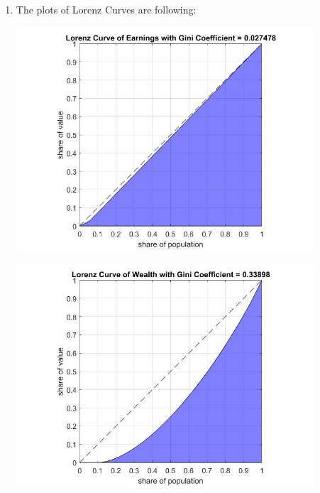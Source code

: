 \documentclass[12pt]{article}
\begin{document}
\begin{enumerate}
\begin{center}
\end{center}
\pagebreak
\item The plots of Lorenz Curves are following:
\begin{center}
  \includegraphics[width=111.11mm]{LorenzCurveofEarnings.jpg}
\end{center}
\begin{center}
  \includegraphics[width=111.11mm]{LorenzCurveofWealth.jpg}
\end{center}

\end{enumerate}
\end{document}
